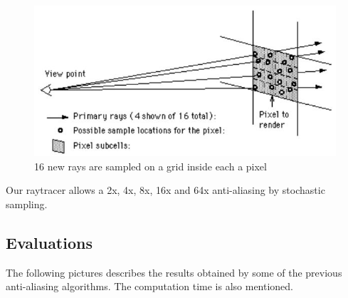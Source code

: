 \begin{figure}[H]
\centering
\includegraphics[width=0.35\linewidth]{img/antialiasing/stochastic.jpg}
\caption{16 new rays are sampled on a grid inside each a pixel}
\label{fig:aa_stochastic}
\end{figure}

Our raytracer allows a 2x, 4x, 8x, 16x and 64x anti-aliasing by stochastic sampling.


\subsection{Evaluations}
The following pictures describes the results obtained by some of the previous anti-aliasing algorithms. The computation time is also mentioned.

